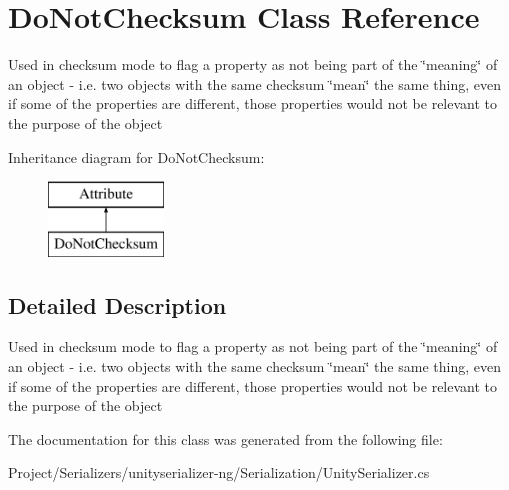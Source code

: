 \hypertarget{class_do_not_checksum}{}\section{Do\+Not\+Checksum Class Reference}
\label{class_do_not_checksum}


Used in checksum mode to flag a property as not being part of the \char`\"{}meaning\char`\"{} of an object -\/ i.\+e. two objects with the same checksum \char`\"{}mean\char`\"{} the same thing, even if some of the properties are different, those properties would not be relevant to the purpose of the object  


Inheritance diagram for Do\+Not\+Checksum\+:\begin{figure}[H]
\begin{center}
\leavevmode
\includegraphics[height=2.000000cm]{class_do_not_checksum}
\end{center}
\end{figure}


\subsection{Detailed Description}
Used in checksum mode to flag a property as not being part of the \char`\"{}meaning\char`\"{} of an object -\/ i.\+e. two objects with the same checksum \char`\"{}mean\char`\"{} the same thing, even if some of the properties are different, those properties would not be relevant to the purpose of the object 



The documentation for this class was generated from the following file\+:\begin{DoxyCompactItemize}
\item 
Project/\+Serializers/unityserializer-\/ng/\+Serialization/Unity\+Serializer.\+cs\end{DoxyCompactItemize}
